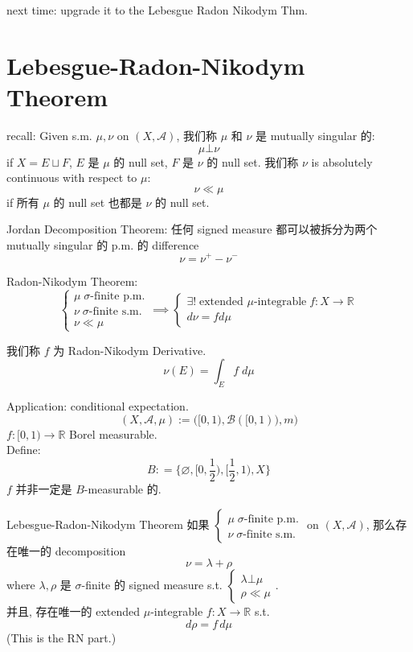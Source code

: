 \documentclass[lang=cn,11pt]{elegantbook}
\begin{document}
next time: upgrade it to the Lebesgue Radon Nikodym Thm.











\chapter{Lebesgue-Radon-Nikodym Theorem}
recall: Given s.m. $\mu, \nu$ on $(X,\mathcal{A})$, 我们称 $\mu$ 和 $\nu$ 是 mutually singular 的:   \[
\mu \bot \nu 
\]if $X = E \sqcup F$, $E$ 是 $\mu$ 的 null set, $F$ 是 $\nu$ 的 null set.
我们称 $\nu$ is absolutely continuous with respect to $\mu$: \[
\nu  \ll \mu 
\]
if 所有 $\mu$ 的 null set 也都是 $\nu$ 的 null set.


Jordan Decomposition Theorem: 任何 signed measure 都可以被拆分为两个 mutually singular 的 p.m. 的 difference \[
\nu = \nu^+ - \nu^-
\]

Radon-Nikodym Theorem: \[
\begin{cases}
    \mu \; \sigma\text{-finite p.m.} \\
     \nu \; \sigma\text{-finite s.m.} \\
     \nu \ll \mu
\end{cases}\implies \begin{cases}
    \exists !\; \text{extended } \mu\text{-integrable}\; f: X\to \mathbb{R}\\
    d\nu = f d\mu
\end{cases}
\]

我们称 $f$ 为 Radon-Nikodym Derivative. \[
\nu(E) = \int_E f \; d\mu
\]


\begin{example}
Application: conditional expectation.\\
\[
(X,\mathcal{A},\mu)  := \bigg([0,1), \mathcal{B}([0,1)), m\bigg)
\]
$f:[0,1) \to \mathbb{R}$ Borel measurable.\\
Define: \[
B: = \{\varnothing, [0,\frac{1}{2}), [\frac{1}{2},1),X  \}
\]
$f$ 并非一定是 $B$-measurable 的. 

\end{example}




\begin{theorem}{Lebesgue-Radon-Nikodym Theorem}
    如果 $\begin{cases}
    \mu \; \sigma\text{-finite p.m.} \\
     \nu \; \sigma\text{-finite s.m.} 
\end{cases}$ on $(X,\mathcal{A})$, 那么存在唯一的 decomposition \[
\nu = \lambda + \rho 
\]where $\lambda, \rho$ 是 $\sigma$-finite 的 signed measure s.t. $\begin{cases}
    \lambda \bot \mu \\
    \rho \ll \mu
\end{cases}$.\\
并且, 存在唯一的 extended $\mu$-integrable $f:X\to \mathbb{R}$ s.t. \[
d \rho = f \,d\mu
\]
(This is the RN part.)
\end{theorem}
\end{document}
